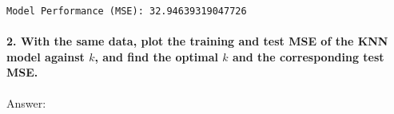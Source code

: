\documentclass[11pt]{article}
\begin{document}
    \begin{Verbatim}[commandchars=\\\{\}]
Model Performance (MSE): 32.94639319047726
    \end{Verbatim}

    \hypertarget{with-the-same-data-plot-the-training-and-test-mse-of-the-knn-model-against-k-and-find-the-optimal-k-and-the-corresponding-test-mse.}{%
\paragraph{\texorpdfstring{2. With the same data, plot the training and
test MSE of the KNN model against \(k\), and find the optimal \(k\) and
the corresponding test
MSE.}{2. With the same data, plot the training and test MSE of the KNN model against k, and find the optimal k and the corresponding test MSE.}}\label{with-the-same-data-plot-the-training-and-test-mse-of-the-knn-model-against-k-and-find-the-optimal-k-and-the-corresponding-test-mse.}}

Answer:
\end{document}

